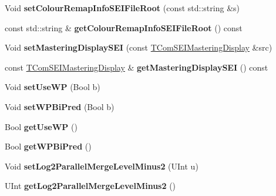 \begin{DoxyCompactItemize}
\item 
\mbox{\label{class_t_enc_cfg_a092cac83576a7ec1875c926eb72549d2}} 
Void {\bfseries set\+Colour\+Remap\+Info\+S\+E\+I\+File\+Root} (const std\+::string \&s)
\item 
\mbox{\label{class_t_enc_cfg_a658f64884c46919ac87d718d0a67bbb4}} 
const std\+::string \& {\bfseries get\+Colour\+Remap\+Info\+S\+E\+I\+File\+Root} () const
\item 
\mbox{\label{class_t_enc_cfg_a1b965239ab756ea93097060d68bd1f47}} 
Void {\bfseries set\+Mastering\+Display\+S\+EI} (const \hyperlink{struct_t_com_s_e_i_mastering_display}{T\+Com\+S\+E\+I\+Mastering\+Display} \&src)
\item 
\mbox{\label{class_t_enc_cfg_a55166c69a6b6aa4e0d15ee7548b829f9}} 
const \hyperlink{struct_t_com_s_e_i_mastering_display}{T\+Com\+S\+E\+I\+Mastering\+Display} \& {\bfseries get\+Mastering\+Display\+S\+EI} () const
\item 
\mbox{\label{class_t_enc_cfg_a0b822c41b5b92f94bb9bf1fe5950ec6b}} 
Void {\bfseries set\+Use\+WP} (Bool b)
\item 
\mbox{\label{class_t_enc_cfg_a4875c32af3599518bbccb8c4b20148ea}} 
Void {\bfseries set\+W\+P\+Bi\+Pred} (Bool b)
\item 
\mbox{\label{class_t_enc_cfg_ab52d57207a98945ddd2553d743dd6eaa}} 
Bool {\bfseries get\+Use\+WP} ()
\item 
\mbox{\label{class_t_enc_cfg_a1968aa896e6403213c93df3e68d0c8ca}} 
Bool {\bfseries get\+W\+P\+Bi\+Pred} ()
\item 
\mbox{\label{class_t_enc_cfg_af09920afb9645a89405e37d1b522f8a5}} 
Void {\bfseries set\+Log2\+Parallel\+Merge\+Level\+Minus2} (U\+Int u)
\item 
\mbox{\label{class_t_enc_cfg_a636ef0f8aed478727332e99772557ccc}} 
U\+Int {\bfseries get\+Log2\+Parallel\+Merge\+Level\+Minus2} ()
\item 
\mbox{\label{class_t_enc_cfg_a733d2fd813344e34fc6ac95d38a97cc9}} 

\end{DoxyCompactItemize}
